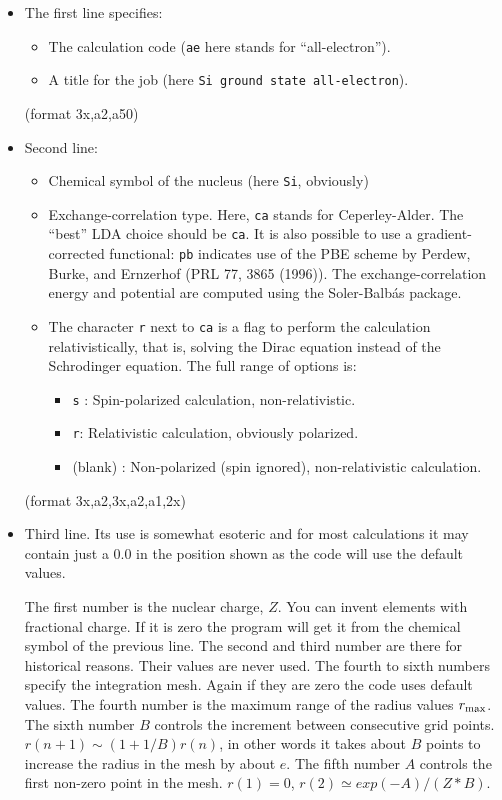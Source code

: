 \documentclass[11pt]{article}
\begin{document}
\begin{itemize}
\item The first line specifies:
	\begin{itemize}
	\item The calculation code ({\tt ae} here stands for ``all-electron'').
	\item A title for the job (here {\tt Si ground state all-electron}).
	\end{itemize} 
	(format 3x,a2,a50)

\item Second line:
	\begin{itemize}

	\item Chemical symbol of the nucleus (here {\tt Si}, obviously)
	\item Exchange-correlation type. Here, {\tt ca} stands for
          Ceperley-Alder.  The
          ``best'' LDA choice should be {\tt ca}.  It is also possible
          to use a gradient-corrected functional: {\tt pb} indicates use
          of the PBE scheme by Perdew, Burke, and Ernzerhof (PRL 77,
          3865 (1996)).
	  The exchange-correlation energy and potential
	  are computed using the Soler-Balb\'as package. 
   
	\item The character {\tt r} next to {\tt ca} is a flag to perform the
          calculation relativistically, that is, solving the Dirac equation
          instead of the Schrodinger equation. 
	  The full range of options is:
	    \begin{itemize}
		\item {\tt s} : Spin-polarized calculation, non-relativistic.
		\item {\tt r}: Relativistic calculation, obviously polarized.
		\item (blank) : Non-polarized (spin ignored), non-relativistic
           		calculation.
	    \end{itemize}
	\end{itemize}
	
	(format 3x,a2,3x,a2,a1,2x)

\item Third line. Its use is somewhat esoteric and for most
calculations it may contain just a 0.0 in the
position shown as the code will use the default values.

The first number is the nuclear charge, $Z$.  You can invent elements with fractional charge.
If it is zero the program will get it from the chemical symbol of the previous line.
The second and third number are there for historical reasons.  Their values are
never used.  The fourth to sixth numbers specify the integration mesh.
Again if they are zero the code uses default values.
The fourth number is the maximum range of the radius values $r_{\rm max}$.  
The sixth number $B$ controls the increment between consecutive grid points.
$r(n+1) \sim (1+1/B) r(n)$, in other words it takes about $B$ points to increase the
radius in the mesh by about $e$.  The fifth number $A$ controls the first non-zero
point in the mesh. $r(1) = 0$, $r(2) \simeq exp(-A)/(Z*B)$.


\end{itemize}
\end{document}
